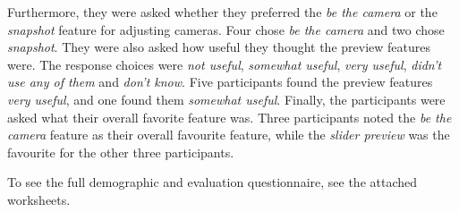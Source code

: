 Furthermore, they were asked whether they preferred the \textit{be the camera} or the \textit{snapshot} feature for adjusting cameras. Four chose \textit{be the camera} and two chose \textit{snapshot}. 
They were also asked how useful they thought the preview features were. The response choices were \textit{not useful}, \textit{somewhat useful}, \textit{very useful}, \textit{didn't use any of them} and \textit{don't know}. Five participants found the preview features \textit{very useful}, and one found them \textit{somewhat useful}.
Finally, the participants were asked what their overall favorite feature was. Three participants noted the \textit{be the camera} feature as their overall favourite feature, while the \textit{slider preview} was the favourite for the other three participants. 

To see the full demographic and evaluation questionnaire, see the attached worksheets.



